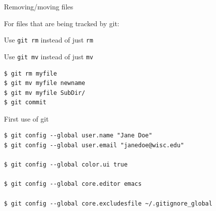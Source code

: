 \documentclass[12pt,t]{beamer}
\begin{document}
\begin{frame}[fragile]{Removing/moving files}

\vspace{24pt}

For files that are being tracked by git:

\bigskip

\hspace{1em} Use {\tt \hilit git rm} instead of just {\tt rm}

\hspace{1em} Use {\tt \hilit git mv} instead of just {\tt mv}

\bigskip

\begin{lstlisting}
$ git rm myfile
$ git mv myfile newname
$ git mv myfile SubDir/
$ git commit
\end{lstlisting}

\end{frame}




\begin{frame}[fragile]{First use of git}

\vspace{24pt}

\begin{lstlisting}
$ git config --global user.name "Jane Doe"
$ git config --global user.email "janedoe@wisc.edu"

$ git config --global color.ui true

$ git config --global core.editor emacs

$ git config --global core.excludesfile ~/.gitignore_global
\end{lstlisting}

\end{frame}
\end{document}
